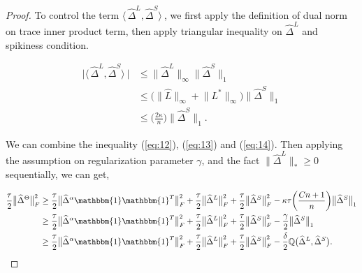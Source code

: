 \documentclass[AMS,STIX1COL]{WileyNJD-v2}
\begin{document}
{\begin{proof}
To control the term $ \big\langle\, \widehat\Delta^{L}, \widehat\Delta^{S} \big\rangle\ $, we first apply the definition of dual norm on trace inner product term, then apply triangular inequality on $\widehat{\Delta}^{L}$ and spikiness condition.

\begin{align}
    \big| \big\langle\, \widehat\Delta^{L}, \widehat\Delta^{S} \big\rangle\ \big| \nonumber
    &\leq \big\|\widehat{\Delta}^{L}\big\|_{\infty} \big\|\widehat{\Delta}^{S}\big\|_1\\ \nonumber
    &\leq \bigg(\big\|\widehat{L}\big\|_{\infty} + \big\|L^{*}\big\|_{\infty}\bigg)
    \big\|\widehat{\Delta}^{S} \big\|_{1}\\
    &\leq \bigg(\frac{2\kappa}{n}\bigg)\big\|\widehat{\Delta}^{S} \big\|_{1}. \label{eq:14}
\end{align}

We can combine the inequality (\ref{eq:12}), (\ref{eq:13}) and (\ref{eq:14}). Then applying the assumption on regularization parameter $\gamma$, and the fact $\big\|\widehat{\Delta}^{L}\big\|_{\ast}\geq0$ sequentially, we can get,

\begin{align}
    \frac{\tau}{2}\big\|\widehat{\Delta}^{\Theta}\big\|_{F}^{2}  \nonumber
    &\geq \frac{\tau}{2} \big\|\widehat{\Delta}^{\alpha}\mathbbm{1}\mathbbm{1}^T\big\|_{F}^{2} + \frac{\tau}{2} \big\|\widehat{\Delta}^{L}\big\|_{F}^{2} + \frac{\tau}{2} \big\|\widehat{\Delta}^{S}\big\|_{F}^{2}
    - \kappa\tau\bigg(\frac{Cn+1}{n}\bigg)\big\|\widehat{\Delta}^{S}\big\|_{1} \\ \nonumber
    &\geq \frac{\tau}{2} \big\|\widehat{\Delta}^{\alpha}\mathbbm{1}\mathbbm{1}^T\big\|_{F}^{2} + \frac{\tau}{2} \big\|\widehat{\Delta}^{L}\big\|_{F}^{2} + \frac{\tau}{2} \big\|\widehat{\Delta}^{S}\big\|_{F}^{2} - \frac{\gamma}{2}\big\|\widehat{\Delta}^{S}\big\|_{1}\\
    &\geq \frac{\tau}{2} \big\|\widehat{\Delta}^{\alpha}\mathbbm{1}\mathbbm{1}^T\big\|_{F}^{2} + \frac{\tau}{2} \big\|\widehat{\Delta}^{L}\big\|_{F}^{2} + \frac{\tau}{2} \big\|\widehat{\Delta}^{S}\big\|_{F}^{2} - \frac{\delta}{2} \mathbb{Q}\big(\widehat{\Delta}^L,\widehat{\Delta}^S\big). \label{eq:26}
\end{align}


\end{proof}}
\end{document}
